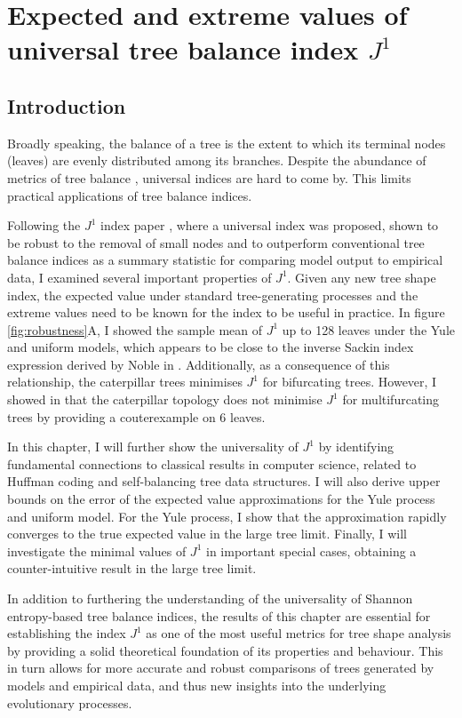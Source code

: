 \chapter{Expected and extreme values of universal tree balance index $J^1$}\label{chapter:trees}


\section{Introduction}
Broadly speaking, the balance of a tree is the extent to which its terminal
nodes (leaves) are evenly distributed among its branches. Despite the abundance
of metrics of tree balance \cite{fischer_tree_2021}, universal indices are hard
to come by. This limits practical applications of tree balance indices. \par
Following the $J^1$ index paper \cite{lemant_robust_2022}, where a universal
index was proposed, shown to be robust to the removal of small nodes and to
outperform conventional tree balance indices as a summary statistic for
comparing model output to empirical data, I examined several important
properties of $J^1$. Given any new tree shape index, the expected value under
standard tree-generating processes and the extreme values need to be known for
the index to be useful in practice. In figure \ref{fig:robustness}A, I showed
the sample mean of $J^1$ up to 128 leaves under the Yule and uniform models,
which appears to be close to the inverse Sackin index expression derived by
Noble in \cite{lemant_robust_2022}. Additionally, as a consequence of this
relationship, the caterpillar trees minimises $J^1$ for bifurcating trees.
However, I showed in \cite{lemant_robust_2022} that the caterpillar topology
does not minimise $J^1$ for multifurcating trees by providing a couterexample
on $6$ leaves. \par
In this chapter, I will further show the universality of $J^1$ by identifying
fundamental connections to classical results in computer science, related to
Huffman coding and self-balancing tree data structures. I will also derive
upper bounds on the error of the expected value approximations for the Yule
process and uniform model. For the Yule process, I show that the approximation
rapidly converges to the true expected value in the large tree limit. Finally,
I will investigate the minimal values of $J^1$ in important special cases,
obtaining a counter-intuitive result in the large tree limit. \par
In addition to furthering the understanding of the universality of Shannon
entropy-based tree balance indices, the results of this chapter are essential for
establishing the index $J^1$ as one of the most useful metrics for tree shape
analysis by providing a solid theoretical foundation of its properties and
behaviour. This in turn allows for more accurate and robust comparisons of trees
generated by models and empirical data, and thus new insights into the
underlying evolutionary processes.

